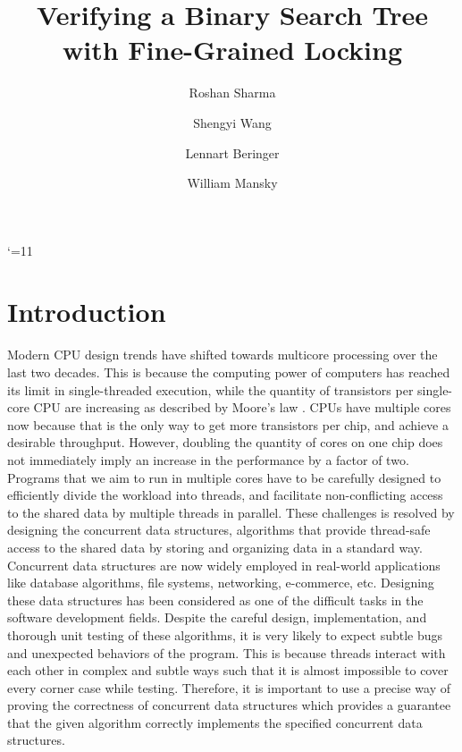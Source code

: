 \documentclass[acmsmall,screen]{acmart}\settopmatter{printfolios=true}
\title{Verifying a Binary Search Tree with Fine-Grained Locking}
\author{Roshan Sharma}
\author{Shengyi Wang}
\author{Lennart Beringer}
\author{William Mansky}
\date{} %
\begin{document}
\maketitle

\catcode`\@=11
\section{Introduction}
Modern CPU design trends have shifted towards multicore processing over the last two decades. This is because the computing power of computers has reached its limit in single-threaded execution, while the quantity of transistors per single-core CPU are increasing as described by Moore's law \cite{moore}. CPUs have multiple cores now because that is the only way to get more transistors per chip, and achieve a desirable throughput. However, doubling the quantity of cores on one chip does not immediately imply an increase in the performance by a factor of two. Programs that we aim to run in multiple cores have to be carefully designed to efficiently divide the workload into threads, and facilitate non-conflicting access to the shared data by multiple threads in parallel. These challenges is resolved by designing the concurrent data structures, algorithms that provide thread-safe access to the shared data by storing and organizing data in a standard way. Concurrent data structures are now widely employed in real-world applications like database algorithms, file systems, networking, e-commerce, etc. Designing these data structures has been considered as one of the difficult tasks in the software development fields. Despite the careful design, implementation, and thorough unit testing of these algorithms, it is very likely to expect subtle bugs and unexpected behaviors of the program. This is because threads interact with each other in complex and subtle ways such that it is almost impossible to cover every corner case while testing. Therefore, it is important to use a precise way of proving the correctness of concurrent data structures which provides a guarantee that the given algorithm correctly implements the specified concurrent data structures.
\end{document}
